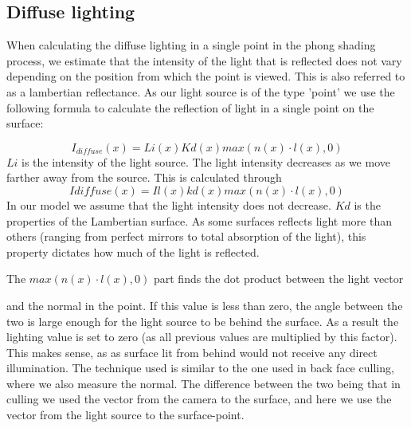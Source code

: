\subsection{Diffuse lighting}
When calculating the diffuse lighting in a single point in the phong shading
process, we estimate that the intensity of the light that is reflected does not
vary depending on the position from which the point is viewed. This is also
referred to as a lambertian reflectance. As our light source is of the type
'point' we use the following formula to calculate the reflection of light in a
single point on the surface:

$$I_{diffuse}(x) = Li(x) Kd(x) max(n(x) \cdot l(x), 0)$$ $Li$ is the intensity of
the light source. The light intensity decreases as we move farther away from
the source. This is calculated through $$Idiffuse(x) = Il(x) kd(x) max(n(x) \cdot
l(x), 0)$$
 In our model we assume that the light intensity does not decrease.
$Kd$ is the properties of the Lambertian surface. As some surfaces reflects
light more than others (ranging from perfect mirrors to total absorption of the
light), this property dictates how much of the light is reflected.

The $max(n(x) \cdot l(x), 0)$ part finds the dot product between the light vector

and the normal in the point. If this value is less than zero, the angle between
the two is large enough for the light source to be behind the surface. As a
result the lighting value is set to zero (as all previous values are multiplied
by this factor). This makes sense, as as surface lit from behind would not
receive any direct illumination. The technique used is similar to the one used
in back face culling, where we also measure the normal. The difference between
the two being that in culling we used the vector from the camera to the
surface, and here we use the vector from the light source to the surface-point. 

